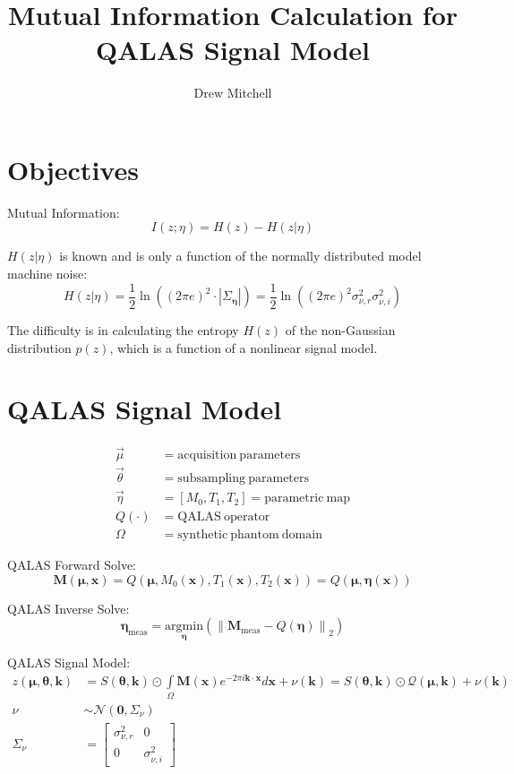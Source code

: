 \documentclass{article}         %
\theoremstyle{definition}
\theoremstyle{remark}
\newcommand{\eq}[1]{\begin{equation} #1 \end{equation}}
\newcommand{\eqsp}[1]{\begin{equation}\begin{split} #1 \end{split}\end{equation}}
\newcommand{\bracket}[1]{\left[#1\right]}
\newcommand{\arr}[2]{\begin{array}{#1} #2 \end{array}}
\newcommand{\brkarray}[2]{\bracket{\arr{#1}{#2}}}
\begin{document}
\title{Mutual Information Calculation for QALAS Signal Model}
\author{Drew Mitchell}
\maketitle



\section{Objectives}\label{Objectives}

Mutual Information:
\eq{I(z;\eta)=H(z)-H(z|\eta)}

$H(z|\eta)$ is known and is only a function of the normally distributed model machine noise:
\eq{H(z|\eta)=\frac{1}{2}\ln\left((2\pi e)^2\cdot|\Sigma_{\mathbf{\eta}}|\right)=\frac{1}{2}\ln\left((2\pi e)^2\sigma_{\nu,r}^2\sigma_{\nu,i}^2\right)}

The difficulty is in calculating the entropy $H(z)$ of the non-Gaussian distribution $p(z)$, which is a function of a nonlinear signal model.

\section{QALAS Signal Model}\label{qalasmodel}

\eqsp{\vec{\mu}&=\mathrm{acquisition\ parameters}\\
	\vec{\theta}&=\mathrm{subsampling\ parameters}\\
	\vec{\eta}&=[M_0,T_1,T_2]=\mathrm{parametric\ map}\\
	Q(\cdot)&=\mathrm{QALAS\ operator}\\
	\Omega&=\mathrm{synthetic\ phantom\ domain}}

QALAS Forward Solve: \eq{\mathbf{M}(\mathbf{\mu},\mathbf{x})=Q(\mathbf{\mu},M_0(\mathbf{x}),T_1(\mathbf{x}),T_2(\mathbf{x}))=Q(\mathbf{\mu},\mathbf{\eta}(\mathbf{x}))}

QALAS Inverse Solve: \eq{\mathbf{\eta}_{\mathrm{meas}}=\underset{\mathbf{\eta}}{\mathrm{argmin}}\left(\left\|\mathbf{M}_{\mathrm{meas}}-Q(\mathbf{\eta})\right\|_2\right)}

QALAS Signal Model:
\eqsp{z(\mathbf{\mu},\mathbf{\theta},\mathbf{k})&=S(\mathbf{\theta},\mathbf{k})\odot\int\limits_{\Omega}\mathbf{M}(\mathbf{x})e^{-2\pi i\mathbf{k}\cdot\mathbf{x}}d\mathbf{x}+\nu(\mathbf{k})=S(\mathbf{\theta},\mathbf{k})\odot\mathcal{Q}(\mathbf{\mu},\mathbf{k})+\nu(\mathbf{k})\\
\nu&\sim\mathcal{N}(\mathbf{0},\Sigma_\nu)\\
\Sigma_\nu&=\brkarray{cc}{\sigma_{\nu,r}^2 & 0 \\ 0 & \sigma_{\nu,i}^2}}
\end{document}
